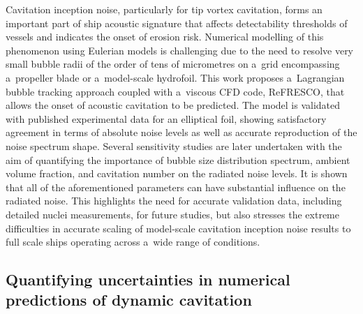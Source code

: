 \documentclass[a4paper,10pt]{article}
\begin{document}
Cavitation inception noise, particularly for tip vortex cavitation, forms an important part of ship acoustic signature that affects detectability thresholds of vessels and indicates the onset of erosion risk.
    Numerical modelling of this phenomenon using Eulerian models is challenging due to the need to resolve very small bubble radii of the order of tens of micrometres on a~grid encompassing a~propeller blade or a~model-scale hydrofoil.
    This work proposes a~Lagrangian bubble tracking approach coupled with a~viscous CFD code, ReFRESCO, that allows the onset of acoustic cavitation to be predicted.
    The model is validated with published experimental data for an elliptical foil, showing satisfactory agreement in terms of absolute noise levels as well as accurate reproduction of the noise spectrum shape.
    Several sensitivity studies are later undertaken with the aim of quantifying the importance of bubble size distribution spectrum, ambient volume fraction, and cavitation number on the radiated noise levels.
    It is shown that all of the aforementioned parameters can have substantial influence on the radiated noise.
    This highlights the need for accurate validation data, including detailed nuclei measurements, for future studies, but also stresses the extreme difficulties in accurate scaling of model-scale cavitation inception noise results to full scale ships operating across a~wide range of conditions.

\subsection{Quantifying uncertainties in numerical predictions of dynamic cavitation \cite{dekkers_quantifying_2024}}
\end{document}
